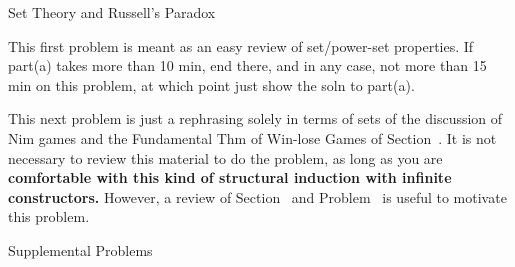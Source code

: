 \documentclass[handout]{mcs}
\begin{document}

\begin{staffnotes}
Set Theory and Russell's Paradox
\end{staffnotes}


\begin{staffnotes}
This first problem is meant as an easy review of set/power-set
properties.  If part(a) takes more than 10 min, end there, and in any
case, not more than 15 min on this problem, at which point just show
the soln to part(a).
\end{staffnotes}


\begin{staffnotes}
This next problem is just a rephrasing solely in terms of sets of the
discussion of Nim games and the Fundamental Thm of Win-lose Games of
Section~.  It is not necessary to review this
material to do the problem, as long as you are \textbf{comfortable
  with this kind of structural induction with infinite constructors.}
However, a review of Section~ and
Problem~ is useful to motivate this problem.
\end{staffnotes}




\begin{center}
Supplemental Problems
\end{center}






\end{document}
